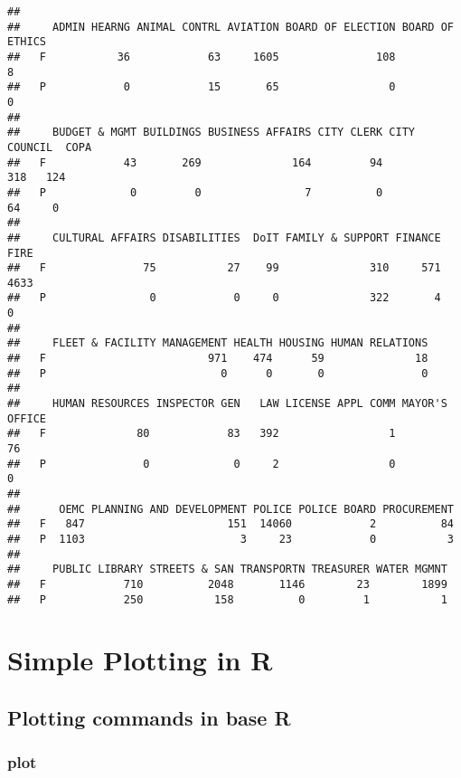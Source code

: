 \documentclass[]{book}
\begin{document}
\begin{verbatim}
##    
##     ADMIN HEARNG ANIMAL CONTRL AVIATION BOARD OF ELECTION BOARD OF ETHICS
##   F           36            63     1605               108               8
##   P            0            15       65                 0               0
##    
##     BUDGET & MGMT BUILDINGS BUSINESS AFFAIRS CITY CLERK CITY COUNCIL  COPA
##   F            43       269              164         94          318   124
##   P             0         0                7          0           64     0
##    
##     CULTURAL AFFAIRS DISABILITIES  DoIT FAMILY & SUPPORT FINANCE  FIRE
##   F               75           27    99              310     571  4633
##   P                0            0     0              322       4     0
##    
##     FLEET & FACILITY MANAGEMENT HEALTH HOUSING HUMAN RELATIONS
##   F                         971    474      59              18
##   P                           0      0       0               0
##    
##     HUMAN RESOURCES INSPECTOR GEN   LAW LICENSE APPL COMM MAYOR'S OFFICE
##   F              80            83   392                 1             76
##   P               0             0     2                 0              0
##    
##      OEMC PLANNING AND DEVELOPMENT POLICE POLICE BOARD PROCUREMENT
##   F   847                      151  14060            2          84
##   P  1103                        3     23            0           3
##    
##     PUBLIC LIBRARY STREETS & SAN TRANSPORTN TREASURER WATER MGMNT
##   F            710          2048       1146        23        1899
##   P            250           158          0         1           1
\end{verbatim}

\hypertarget{simple-plotting-in-r}{%
\chapter{Simple Plotting in R}\label{simple-plotting-in-r}}

\hypertarget{baseplotting}{%
\section*{Plotting commands in base R}\label{baseplotting}}

\hypertarget{plot}{%
\subsection*{\texorpdfstring{\textbf{plot}}{plot}}\label{plot}}
\end{document}
